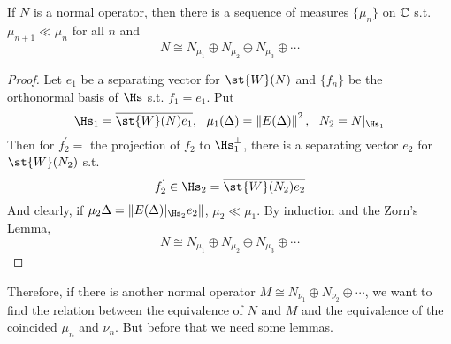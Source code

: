 \begin{thm}
	If $N$ is a normal operator, then there is a sequence of measures $\{\mu_n\}$ on $\mathbb{C}$ s.t. $\mu_{n+1} \ll \mu_{n}$ for all $n$ and 
	\begin{equation*}
		N \cong N_{\mu_1} \oplus N_{\mu_2} \oplus N_{\mu_3} \oplus \cdots
	\end{equation*}
\end{thm}
\begin{proof}
	Let $e_1$ be a separating vector for $\st{W}(N)$ and $\{f_n\}$ be the orthonormal basis of $\Hs$ s.t. $f_1 = e_1$. Put
	\begin{equation*}
		\Hs_1 = \clo{\st{W}(N)e_1},~~\mu_1(\Delta) = \norm{E(\Delta)}^2,~~ N_2 = N|_{\Hs_1}
	\end{equation*}
	Then for $f_2^{'} = $ the projection of $f_2$ to $\Hs_1^{\bot}$, there is a separating vector $e_2$ for $\st{W}(N_2)$ s.t. 
	\begin{equation*}
		f_2^{'} \in \Hs_2 = \clo{\st{W}(N_2)e_2}
	\end{equation*} 
	And clearly, if $\mu_2{\Delta} = \norm{E(\Delta)|_{\Hs_2}e_2}$, $\mu_2 \ll \mu_1$. By induction and the Zorn's Lemma, 
	\begin{equation*}
		N \cong N_{\mu_1} \oplus N_{\mu_2} \oplus N_{\mu_3} \oplus \cdots
	\end{equation*}
\end{proof}

Therefore, if there is another normal operator $M \cong N_{\nu_1} \oplus N_{\nu_2} \oplus \cdots$, we want to find the relation between the equivalence of $N$ and $M$ and the equivalence of the coincided $\mu_n$ and $\nu_n$. But before that we need some lemmas.

